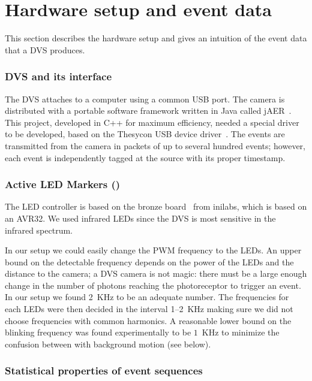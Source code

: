 
\section{Hardware setup and event data\label{sec:Hardware-setup-and}}

This section describes the hardware setup and gives an intuition of
the event data that a DVS produces.


\subsubsection{DVS and its interface\label{sec:interface}}

The DVS attaches to a computer using a common USB port. The camera
is distributed with a portable software framework written in Java
called jAER~\cite{jaer}. This project, developed in C++ for maximum
efficiency, needed a special driver to be developed, based on the
Thesycon USB device driver~\cite{thesycon}. The events are transmitted
from the camera in packets of up to several hundred events; however,
each event is independently tagged at the source with its proper timestamp.



\subsubsection{Active LED Markers (\ALMs)\label{sec:leds}}

The LED controller is based on the bronze board~\cite{bronzeboard}
from inilabs, which is based on an AVR32.  We used infrared LEDs
since the DVS is most sensitive in the infrared spectrum. 



In our setup we could easily change the PWM frequency to the LEDs.
An upper bound on the detectable frequency depends on the power of
the LEDs and the distance to the camera; a DVS camera is not magic:
there must be a large enough change in the number of photons reaching
the photoreceptor to trigger an event. In our setup we found 2~KHz
to be an adequate number. The frequencies for each LEDs were then
decided in the interval 1--2~KHz making sure we did not choose frequencies
with common harmonics. A reasonable lower bound on the blinking frequency
was found experimentally to be $1$~KHz to minimize the confusion
between with background motion (see 
below).


\subsubsection{Statistical properties of event sequences}

